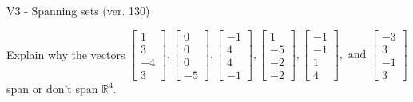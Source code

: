 \begin{exercise}
  \begin{exerciseTitle}V3 - Spanning sets (ver. 130)\end{exerciseTitle}
  \begin{exerciseStatement}
    Explain why the vectors \(\left[\begin{array}{r}
1 \\
3 \\
-4 \\
3
\end{array}\right] , \left[\begin{array}{r}
0 \\
0 \\
0 \\
-5
\end{array}\right] , \left[\begin{array}{r}
-1 \\
4 \\
4 \\
-1
\end{array}\right] , \left[\begin{array}{r}
1 \\
-5 \\
-2 \\
-2
\end{array}\right] , \left[\begin{array}{r}
-1 \\
-1 \\
1 \\
4
\end{array}\right] , \text{ and } \left[\begin{array}{r}
-3 \\
3 \\
-1 \\
3
\end{array}\right]\) span or don't span \(\mathbb{R}^4\). 
	



\end{exerciseStatement}
\end{exercise}
